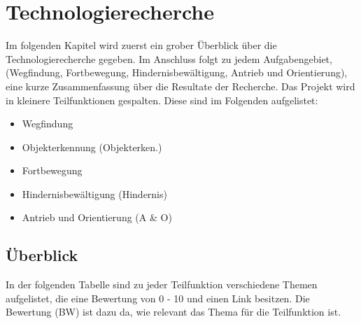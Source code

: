 \documentclass[../main.tex]{subfiles}
\begin{document}
\newpage
\section{Technologierecherche}

Im folgenden Kapitel wird zuerst ein grober Überblick über die Technologierecherche gegeben. Im Anschluss folgt zu jedem Aufgabengebiet, (Wegfindung, Fortbewegung, Hindernisbewältigung, Antrieb und Orientierung), eine kurze Zusammenfassung über die Resultate der Recherche. Das Projekt wird in kleinere Teilfunktionen gespalten. Diese sind im Folgenden aufgelistet:
\begin{itemize}
    \item Wegfindung 
    \item Objekterkennung (Objekterken.)
    \item Fortbewegung
    \item Hindernisbewältigung (Hindernis)
    \item Antrieb und Orientierung (A \& O)
\end{itemize}


\subsection{Überblick}
In der folgenden Tabelle sind zu jeder Teilfunktion verschiedene Themen aufgelistet, die eine Bewertung von 0 - 10 und einen Link besitzen. Die Bewertung (BW) ist dazu da, wie relevant das Thema für die Teilfunktion ist.
\end{document}
